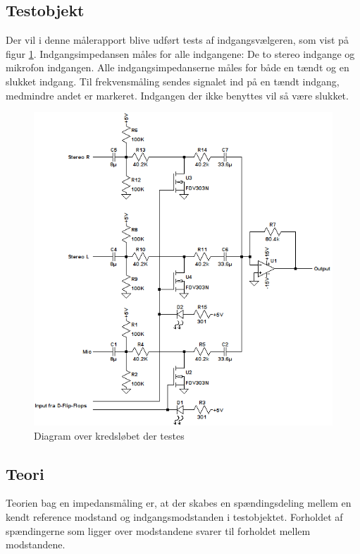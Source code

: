 \subsection*{Testobjekt}
\label{maalejournal_testobjekt}
Der vil i denne målerapport blive udført tests af indgangsvælgeren, som vist på figur \ref{maalerap-diagram_simulering}. Indgangsimpedansen måles for alle indgangene: De to stereo indgange og mikrofon indgangen. Alle indgangsimpedanserne måles for både en tændt og en slukket indgang.
Til frekvensmåling sendes signalet ind på en tændt indgang, medmindre andet er markeret. Indgangen der ikke benyttes vil så være slukket.
\begin{figure}[h]
\centering
\includegraphics[scale=0.8]{maalerapporter/indgangsvaelger/indgangvaelger_ltspice_diagram.png}
\caption{Diagram over kredsløbet der testes}
\label{maalerap-diagram_simulering}
\end{figure}

\subsection*{Teori}
\label{maalejournal_teori}
Teorien bag en impedansmåling er, at der skabes en spændingsdeling mellem en kendt reference modstand og indgangsmodstanden i testobjektet. Forholdet af spændingerne som ligger over modstandene svarer til forholdet mellem modstandene.

